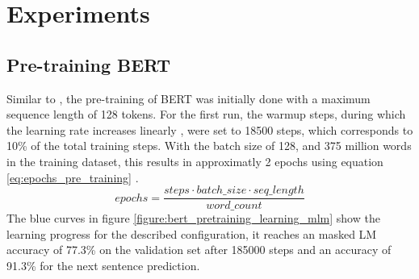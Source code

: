 \chapter{Experiments}\label{ch:experiments}

\section{Pre-training \ac{BERT}}
\label{sec:pre_training_results}
Similar to \cite[p. 13]{Devlin2018}, the pre-training of \ac{BERT} was initially done with a maximum sequence length of 128 tokens.
For the first run, the warmup steps, during which the learning rate increases linearly \cite[p. 13]{Devlin2018}, were set to 18500 steps, which corresponds to 10\% of the total training steps.
With the batch size of 128, and 375 million words in the training dataset, this results in approximatly 2 epochs using equation \ref{eq:epochs_pre_training} \cite[p. 13]{Devlin2018}.
\begin{equation}
    \label{eq:epochs_pre_training}
    epochs = \frac{steps \cdot batch\_size \cdot seq\_length}{word\_count}
\end{equation}
The blue curves in figure \ref{figure:bert_pretraining_learning_mlm} show the learning progress for the described configuration, it reaches an masked LM accuracy of 77.3\% on the validation set after 185000 steps and an accuracy of 91.3\% for the next sentence prediction.
